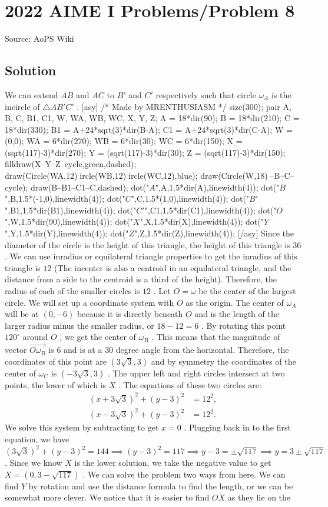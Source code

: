 \documentclass[12pt]{article}
\begin{document}
\section*{{2022 AIME I Problems/Problem 8}}
Source: AoPS Wiki

\subsection*{Solution}
We can extend $AB$ and $AC$ to $B'$ and $C'$ respectively such that circle $\omega_A$ is the incircle of $\triangle AB'C'$ . [asy] /* Made by MRENTHUSIASM */ size(300); pair A, B, C, B1, C1, W, WA, WB, WC, X, Y, Z; A = 18*dir(90); B = 18*dir(210); C = 18*dir(330); B1 = A+24*sqrt(3)*dir(B-A); C1 = A+24*sqrt(3)*dir(C-A); W = (0,0); WA = 6*dir(270); WB = 6*dir(30); WC = 6*dir(150); X = (sqrt(117)-3)*dir(270); Y = (sqrt(117)-3)*dir(30); Z = (sqrt(117)-3)*dir(150); filldraw(X--Y--Z--cycle,green,dashed); draw(Circle(WA,12)^^Circle(WB,12)^^Circle(WC,12),blue); draw(Circle(W,18)^^A--B--C--cycle); draw(B--B1--C1--C,dashed); dot("$A$",A,1.5*dir(A),linewidth(4)); dot("$B$",B,1.5*(-1,0),linewidth(4)); dot("$C$",C,1.5*(1,0),linewidth(4)); dot("$B'$",B1,1.5*dir(B1),linewidth(4)); dot("$C'$",C1,1.5*dir(C1),linewidth(4)); dot("$O$",W,1.5*dir(90),linewidth(4)); dot("$X$",X,1.5*dir(X),linewidth(4)); dot("$Y$",Y,1.5*dir(Y),linewidth(4)); dot("$Z$",Z,1.5*dir(Z),linewidth(4)); [/asy] Since the diameter of the circle is the height of this triangle, the height of this triangle is $36$ . We can use inradius or equilateral triangle properties to get the inradius of this triangle is $12$ (The incenter is also a centroid in an equilateral triangle, and the distance from a side to the centroid is a third of the height). Therefore, the radius of each of the smaller circles is $12$ . Let $O=\omega$ be the center of the largest circle. We will set up a coordinate system with $O$ as the origin. The center of $\omega_A$ will be at $(0,-6)$ because it is directly beneath $O$ and is the length of the larger radius minus the smaller radius, or $18-12 = 6$ . By rotating this point $120^{\circ}$ around $O$ , we get the center of $\omega_B$ . This means that the magnitude of vector $\overrightarrow{O\omega_B}$ is $6$ and is at a $30$ degree angle from the horizontal. Therefore, the coordinates of this point are $(3\sqrt{3},3)$ and by symmetry the coordinates of the center of $\omega_C$ is $(-3\sqrt{3},3)$ . The upper left and right circles intersect at two points, the lower of which is $X$ . The equations of these two circles are: \begin{align*} (x+3\sqrt3)^2 + (y-3)^2 &= 12^2, \\ (x-3\sqrt3)^2 + (y-3)^2 &= 12^2. \end{align*} We solve this system by subtracting to get $x = 0$ . Plugging back in to the first equation, we have $(3\sqrt{3})^2 + (y-3)^2 = 144 \implies (y-3)^2 = 117 \implies y-3 = \pm \sqrt{117} \implies y = 3 \pm \sqrt{117}$ . Since we know $X$ is the lower solution, we take the negative value to get $X = (0,3-\sqrt{117})$ . We can solve the problem two ways from here. We can find $Y$ by rotation and use the distance formula to find the length, or we can be somewhat more clever. We notice that it is easier to find $OX$ as they lie on the 
\end{document}
